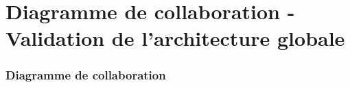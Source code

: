 \part{Diagramme de collaboration - Validation de l'architecture globale}
\setcounter{section}{0}

\section{Diagramme de collaboration}

